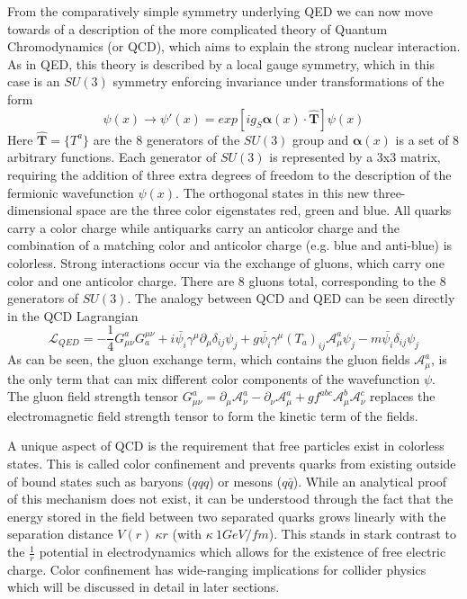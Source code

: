 From the comparatively simple symmetry underlying QED we can now move towards of a description 
of the more complicated theory of Quantum Chromodynamics (or QCD), which aims to explain the strong nuclear 
interaction.  As in QED, this theory is described by a local gauge symmetry, which in this case is an $SU(3)$ symmetry 
enforcing invariance under transformations of the form
\begin{equation}
\psi(x) \rightarrow \psi'(x) = exp[ig_{S} \boldsymbol{\alpha}(x) \cdot \boldsymbol{\hat{T}}] \psi(x)
\end{equation}
Here $\boldsymbol{\hat{T}} =  \{T^a\}$ are the 8 generators of the $SU(3)$ group and $\boldsymbol{\alpha}(x)$ is 
a set of 8 arbitrary functions. Each generator of $SU(3)$ is represented by a 3x3 matrix, requiring the addition of 
three extra degrees of freedom to the description of the fermionic wavefunction $\psi(x)$.  The orthogonal states in 
this new three-dimensional space are the three color eigenstates red, green and blue. All quarks carry a color charge 
while antiquarks carry an anticolor charge and the combination of a matching color and anticolor charge (e.g. blue and 
anti-blue) is colorless.  Strong interactions occur via the exchange of gluons, which carry one color and one anticolor 
charge. There are 8 gluons total, corresponding to the 8 generators of $SU(3)$. The analogy between QCD and QED can 
be seen directly in the QCD Lagrangian
\begin{equation}
\mathcal{L}_{QED} = 
- \frac{1}{4}G^a_{\mu\nu}G^{\mu\nu}_a + i\bar{\psi_i}\gamma^{\mu}\partial_{\mu}\delta_{ij}\psi_j +g\bar{\psi_i}\gamma^{\mu}(T_a)_{ij}\mathcal{A}^a_{\mu}\psi_j  - m\bar{\psi_i}\delta_{ij}\psi_j
\end{equation}
As can be seen, the gluon exchange term, which contains the gluon fields $\mathcal{A}^a_{\mu}$, is the only term that 
can mix different color components of the wavefunction $\psi$. The gluon field strength tensor $G^a_{\mu\nu} = 
\partial_{\mu}\mathcal{A}^a_{\nu} - \partial_{\nu}\mathcal{A}^a_{\mu} + 
gf^{abc}\mathcal{A}^b_{\mu}\mathcal{A}^c_{\nu}$ replaces the electromagnetic field strength tensor to form the 
kinetic term of the fields. \par

A unique aspect of QCD is the requirement that free particles exist in colorless states. This is called color confinement 
and prevents quarks from existing outside of bound states such as baryons ($qqq$) or mesons ($q\bar{q}$). While an 
analytical proof of this mechanism does not exist, it can be understood through the fact that the energy stored in the 
field between two separated quarks grows linearly with the separation distance $V(r) ~ \kappa r$ (with $\kappa ~ 
1 GeV/fm$). This stands in stark contrast to the $\frac{1}{r}$ potential in electrodynamics which allows for the 
existence of free electric charge. Color confinement has wide-ranging implications for collider physics which will be 
discussed in detail in later sections.

